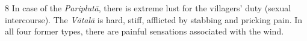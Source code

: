 \begin{translation}
\item [8] In case of the \emph{Pariplutā}, there is extreme lust for the villagers' duty (sexual intercourse).
The \emph{Vātalā} is hard, stiff, afflicted by stabbing and pricking pain.
In all four former types, there are painful sensations associated with the wind.
\end{translation}
